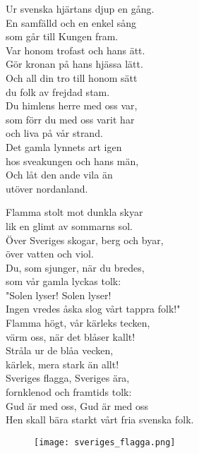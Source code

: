 \documentclass[a6paper, 10pt, twoside]{article}
\begin{document}
\begin{center}
\end{center}
\begin{lyrics}
Ur svenska hjärtans djup en gång.\\
En samfälld och en enkel sång\\
som går till Kungen fram.\\
Var honom trofast och hans ätt.\\
Gör kronan på hans hjässa lätt.\\
Och all din tro till honom sätt\\
du folk av frejdad stam.\\
\newline
Du himlens herre med oss var,\\
som förr du med oss varit har\\
och liva på vår strand.\\
Det gamla lynnets art igen\\
hos sveakungen och hans män,\\
Och låt den ande vila än\\
utöver nordanland.\\
\end{lyrics}

\begin{center}
\end{center}
\begin{lyrics}
Flamma stolt mot dunkla skyar\\
lik en glimt av sommarns sol.\\
Över Sveriges skogar, berg och byar,\\
över vatten och viol.\\
Du, som sjunger, när du bredes,\\
som vår gamla lyckas tolk:\\
"Solen lyser! Solen lyser!\\
Ingen vredes åska slog vårt tappra folk!"
\vspace{5pt}\\
Flamma högt, vår kärleks tecken,\\
värm oss, när det blåser kallt!\\
Stråla ur de blåa vecken,\\
kärlek, mera stark än allt!\\
Sveriges flagga, Sveriges ära,\\
fornklenod och framtids tolk:\\
Gud är med oss, Gud är med oss\\
Hen skall bära starkt vårt fria svenska folk. 
\end{lyrics}
\vspace{20pt}
\begin{figure}[!h]
\centering
\texttt{[image: sveriges\_flagga.png]}
\end{figure}
\end{document}

